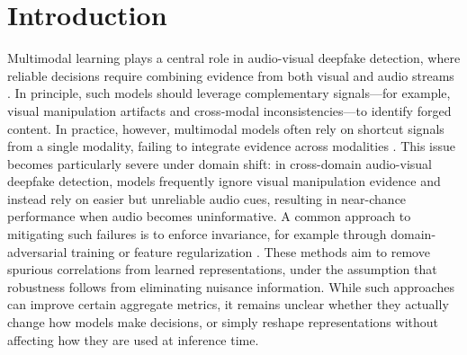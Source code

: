\documentclass{article}
\begin{document}
\section{Introduction}
Multimodal learning plays a central role in audio-visual deepfake detection, where reliable decisions require combining evidence from both visual and audio streams \citep{zhou2021jointav, chung2016syncnet, feng2023avad, liang2024speechforensics, du2025cad}. In principle, such models should leverage complementary signals—for example, visual manipulation artifacts and cross-modal inconsistencies—to identify forged content. In practice, however, multimodal models often rely on shortcut signals from a single modality, failing to integrate evidence across modalities \citep{smeu2025avhalign}. This issue becomes particularly severe under domain shift: in cross-domain audio-visual deepfake detection, models frequently ignore visual manipulation evidence and instead rely on easier but unreliable audio cues, resulting in near-chance performance when audio becomes uninformative.
A common approach to mitigating such failures is to enforce invariance, for example through domain-adversarial training \citep{ganin2016dann} or feature regularization \citep{sun2016deepcoral}. These methods aim to remove spurious correlations from learned representations, under the assumption that robustness follows from eliminating nuisance information. While such approaches can improve certain aggregate metrics, it remains unclear whether they actually change how models make decisions, or simply reshape representations without affecting how they are used at inference time.
\end{document}
